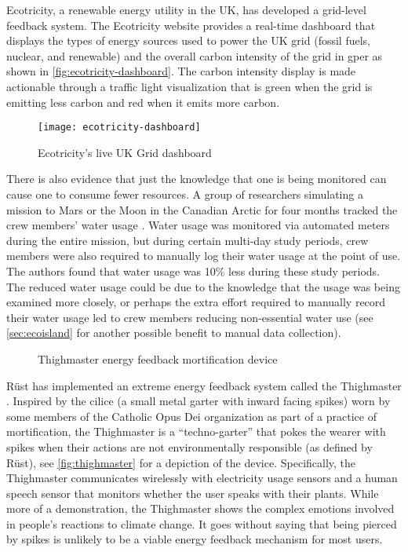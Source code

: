 Ecotricity, a renewable energy utility in the UK, has developed a grid-level feedback system. The Ecotricity website provides a real-time dashboard that displays the types of energy sources used to power the UK grid (fossil fuels, nuclear, and renewable) and the overall carbon intensity of the grid in g\COtwo per \kWh as shown in \autoref{fig:ecotricity-dashboard}. The carbon intensity display is made actionable through a traffic light visualization that is green when the grid is emitting less carbon and red when it emits more carbon. 

\begin{figure}[htbp]
	\centering
		\texttt{[image: ecotricity-dashboard]}
		\caption{Ecotricity's live UK Grid dashboard}
		\label{fig:ecotricity-dashboard}
\end{figure}

There is also evidence that just the knowledge that one is being monitored can cause one to consume fewer resources. A group of researchers simulating a mission to Mars or the Moon in the Canadian Arctic for four months tracked the crew members' water usage \cite{Bamsey2008FMARS}. Water usage was monitored via automated meters during the entire mission, but during certain multi-day study periods, crew members were also required to manually log their water usage at the point of use. The authors found that water usage was 10\% less during these study periods. The reduced water usage could be due to the knowledge that the usage was being examined more closely, or perhaps the extra effort required to manually record their water usage led to crew members reducing non-essential water use (see \autoref{sec:ecoisland} for another possible benefit to manual data collection).

\begin{figure}[htbp]
	\centering
		\caption{Thighmaster energy feedback mortification device}
		\label{fig:thighmaster}
\end{figure}

R\"{u}st has implemented an extreme energy feedback system called the Thighmaster \cite{Rust2008Thighmaster-web}. Inspired by the cilice (a small metal garter with inward facing spikes) worn by some members of the Catholic Opus Dei organization as part of a practice of mortification, the Thighmaster is a ``techno-garter'' that pokes the wearer with spikes when their actions are not environmentally responsible (as defined by R\"{u}st), see \autoref{fig:thighmaster} for a depiction of the device. Specifically, the Thighmaster communicates wirelessly with electricity usage sensors and a human speech sensor that monitors whether the user speaks with their plants. While more of a demonstration, the Thighmaster shows the complex emotions involved in people's reactions to climate change. It goes without saying that being pierced by spikes is unlikely to be a viable energy feedback mechanism for most users.

